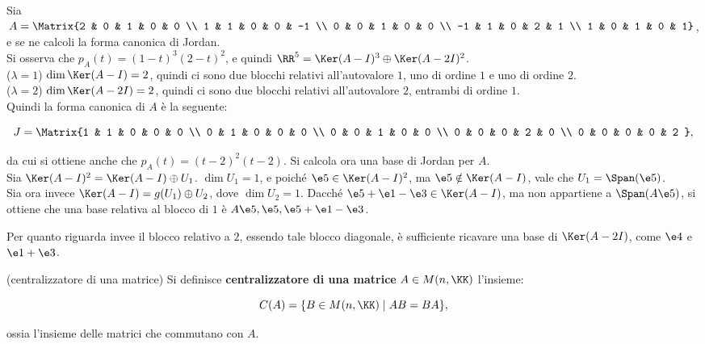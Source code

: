 \documentclass[11pt]{article}
\begin{document}
	\begin{example}
		Sia $A = \Matrix{2 & 0 & 1 & 0 & 0 \\ 1 & 1 & 0 & 0 & -1 \\ 0 & 0 & 1 & 0 & 0 \\ -1 & 1 & 0 & 2 & 1 \\ 1 & 0 & 1 & 0 & 1}$, e se ne calcoli la forma canonica di Jordan. \\
		
		Si osserva che $p_A(t) = (1-t)^3 (2-t)^2$, e quindi
		$\RR^5 = \Ker (A - I)^3 \oplus \Ker (A - 2I)^2$. \\
		
		($\lambda = 1$) $\dim \Ker (A - I) = 2$, quindi ci sono due blocchi
		relativi all'autovalore $1$, uno di ordine $1$ e uno di ordine $2$. \\
		
		($\lambda = 2$) $\dim \Ker (A - 2I) = 2$, quindi ci sono due blocchi
		relativi all'autovalore $2$, entrambi di ordine $1$. \\
		
		Quindi la forma canonica di $A$ è la seguente:
		
		\[ J = \Matrix{1 & 1 & 0 & 0 & 0 \\ 0 & 1 & 0 & 0 & 0 \\ 0 & 0 & 1 & 0 & 0 \\ 0 & 0 & 0 & 2 & 0 \\ 0 & 0 & 0 & 0 & 2 }, \]
		
		da cui si ottiene anche che $p_A(t) = (t-2)^2 (t-2)$. Si calcola
		ora una base di Jordan per $A$. \\
		
		Sia $\Ker (A - I)^2 = \Ker (A - I) \oplus U_1$. $\dim U_1 = 1$,
		e poiché $\e5 \in \Ker (A - I)^2$, ma $\e5 \notin \Ker (A-I)$,
		vale che $U_1 = \Span(\e5)$. \\
		
		Sia ora invece $\Ker (A - I) = g(U_1) \oplus U_2$, dove
		$\dim U_2 = 1$. Dacché $\e5+\e1-\e3  \in \Ker (A-I)$, ma
		non appartiene a $\Span(A \e5)$, si ottiene che una base
		relativa al blocco di $1$ è $A \e5, \e5, \e5+\e1-\e3$.
		
		Per quanto riguarda invee il blocco relativo a $2$, essendo
		tale blocco diagonale, è sufficiente ricavare una base
		di $\Ker (A-2I)$, come $\e4$ e $\e1 + \e3$.
	\end{example}

	\begin{definition} (centralizzatore di una matrice)
		Si definisce \textbf{centralizzatore di una matrice} $A \in M(n, \KK)$
		l'insieme:
		
		\[ C(A) = \{ B \in M(n, \KK) \mid AB = BA\}, \]
		
		ossia l'insieme delle matrici che commutano con $A$.
	\end{definition}
\end{document}
